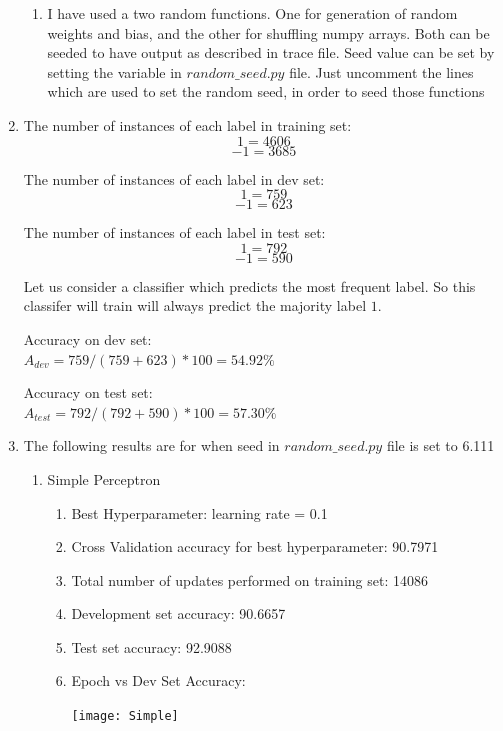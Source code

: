 \begin{enumerate}
\begin{enumerate}
			\item
			I have used a two random functions. One for generation of random weights and bias, and the other for shuffling numpy arrays. Both can be seeded to have output as described in trace file.
			Seed value can be set by setting the variable in $random\_seed.py$ file. Just uncomment the lines which are used to set the random seed, in order to seed those functions
			
		\end{enumerate}	
	
	\item
	The number of instances of each label in training set:
	$$1 	= 4606 $$
	$$-1 = 3685 $$
	
	The number of instances of each label in dev set:
	$$1 	= 759 $$
	$$-1 = 623 $$
	
	The number of instances of each label in test set:
	$$1 	= 792 $$
	$$-1 = 590 $$
	
	Let us consider a classifier which predicts the most frequent label. So this classifer will train will always predict the majority label $1$.
	
	Accuracy on dev set: \\
	$A_{dev} = 759/(759+623)*100 = 54.92 \%$
	
	Accuracy on test set: \\
	$A_{test} = 792/(792+590)*100 = 57.30 \%$
	
	\item
	The following results are for when seed in $random\_seed.py$ file is set to 6.111
	\begin{enumerate}
		\item Simple Perceptron
			\begin{enumerate}
				\item Best Hyperparameter: learning rate = 0.1
				\item Cross Validation accuracy for best hyperparameter: 90.7971
				\item Total number of updates performed on training set: 14086
				\item Development set accuracy: 90.6657
				\item Test set accuracy: 92.9088
				\item Epoch vs Dev Set Accuracy:
					\begin{center}
						\texttt{[image: Simple]}
					\end{center}
			\end{enumerate}
			

\end{enumerate}
\end{enumerate}
